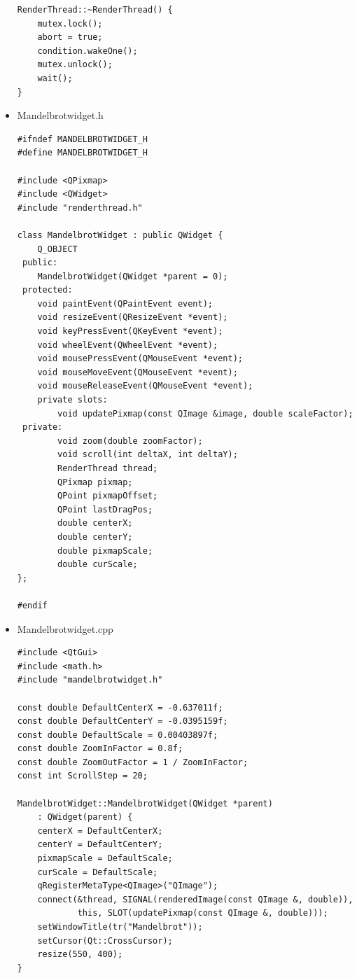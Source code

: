 \documentclass[9pt,b5paper]{article}
\begin{document}
\begin{itemize}
\begin{lstlisting}
RenderThread::~RenderThread() {
    mutex.lock();
    abort = true;
    condition.wakeOne();
    mutex.unlock();
    wait();
}
\end{lstlisting}
\item Mandelbrotwidget.h

\lstset{language=java,label= ,caption= ,numbers=none}
\begin{lstlisting}
#ifndef MANDELBROTWIDGET_H
#define MANDELBROTWIDGET_H

#include <QPixmap>
#include <QWidget>
#include "renderthread.h"

class MandelbrotWidget : public QWidget {
    Q_OBJECT
 public:
    MandelbrotWidget(QWidget *parent = 0);
 protected:
    void paintEvent(QPaintEvent event);
    void resizeEvent(QResizeEvent *event);
    void keyPressEvent(QKeyEvent *event);
    void wheelEvent(QWheelEvent *event);
    void mousePressEvent(QMouseEvent *event);
    void mouseMoveEvent(QMouseEvent *event);
    void mouseReleaseEvent(QMouseEvent *event);
    private slots:
        void updatePixmap(const QImage &image, double scaleFactor);
 private:
        void zoom(double zoomFactor);
        void scroll(int deltaX, int deltaY);
        RenderThread thread;
        QPixmap pixmap;
        QPoint pixmapOffset;
        QPoint lastDragPos;
        double centerX;
        double centerY;
        double pixmapScale;
        double curScale;
};

#endif
\end{lstlisting}
\item Mandelbrotwidget.cpp

\lstset{language=java,label= ,caption= ,numbers=none}
\begin{lstlisting}
#include <QtGui>
#include <math.h>
#include "mandelbrotwidget.h"

const double DefaultCenterX = -0.637011f;
const double DefaultCenterY = -0.0395159f;
const double DefaultScale = 0.00403897f;
const double ZoomInFactor = 0.8f;
const double ZoomOutFactor = 1 / ZoomInFactor;
const int ScrollStep = 20;

MandelbrotWidget::MandelbrotWidget(QWidget *parent)
    : QWidget(parent) {
    centerX = DefaultCenterX;
    centerY = DefaultCenterY;
    pixmapScale = DefaultScale;
    curScale = DefaultScale;
    qRegisterMetaType<QImage>("QImage");
    connect(&thread, SIGNAL(renderedImage(const QImage &, double)),
            this, SLOT(updatePixmap(const QImage &, double)));
    setWindowTitle(tr("Mandelbrot"));
    setCursor(Qt::CrossCursor);
    resize(550, 400);
}


\end{lstlisting}
\end{itemize}
\end{document}
